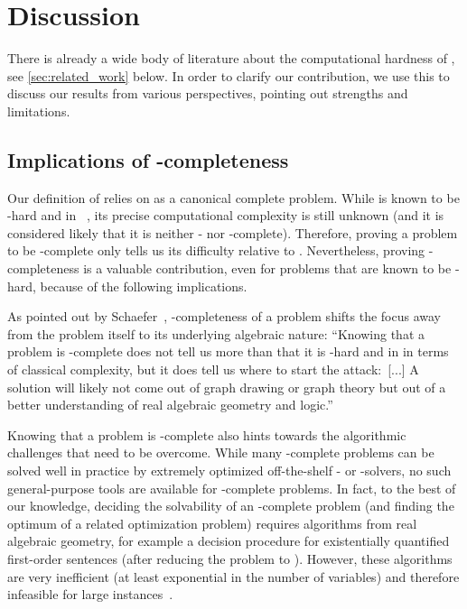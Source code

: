\documentclass{toc}
\begin{document}
\section{Discussion}
\label{sec:discussion}

There is already a wide body of literature about the computational hardness of \ERM, see \cref{sec:related_work} below.
In order to clarify our contribution, we use this  to discuss our results from various perspectives, pointing out strengths and limitations.

\subsection{Implications of \ER-completeness}
Our definition of \ER relies on \ETR as a canonical complete problem.
While \ETR is known to be \NP-hard and in \PSPACE~\cite{Canny1988_PSPACE, Shor1991_Stretchability}, its precise computational complexity is still unknown (and it is considered likely that it is neither \NP- nor \PSPACE-complete).
Therefore, proving a problem to be \ER-complete only tells us its difficulty relative to \ETR.
Nevertheless, proving \ER-completeness is a valuable contribution, even for problems that are known to be \NP-hard, because of the following implications.

As pointed out by Schaefer~\cite{Schaefer2010_GeometryTopology}, \ER-completeness of a problem shifts the focus away from the problem itself to its underlying algebraic nature:
\enquote{Knowing that a problem is \ER-complete does not tell us more than that it is \NP-hard and in \PSPACE{} in terms of classical complexity, but it does tell us where to start the attack:~[...]
A solution will likely not come out of graph drawing or graph theory but out of a better understanding of real algebraic geometry and logic.}~\cite{Schaefer2010_GeometryTopology}

Knowing that a problem is \ER-complete also hints towards the algorithmic challenges that need to be overcome.
While many \NP-complete problems can be solved well in practice by extremely optimized
off-the-shelf \SAT- or \MIP-solvers, no such 
%
general-purpose  %
tools are available for \ER-complete problems.
In fact, to the best of our knowledge,
%
%
deciding the solvability of an \ER-complete problem (and finding the optimum
of a related optimization problem)  %
requires algorithms from real algebraic geometry, for example a decision procedure for
existentially quantified first-order sentences (after reducing the problem to \ETR).
However, these algorithms are very inefficient (at least exponential in the number of
variables) and therefore infeasible for large instances~\cite{Passmore2009_Experiments}.
\end{document}
